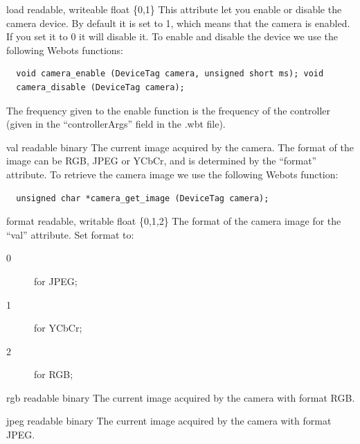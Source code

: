 \noindent
\begin{itemize}
\begin{attribute}{load}
  {readable, writeable}
  {float}
  {\{0,1\}}
  This attribute let you enable or disable the camera
  device.  By default it is set to 1, which means that the camera is
  enabled. If you set it to 0 it will disable it.  To enable and
  disable the device we use the following Webots functions:


\begin{lstlisting}
  void camera_enable (DeviceTag camera, unsigned short ms); void
  camera_disable (DeviceTag camera);
\end{lstlisting}

The frequency given to the enable function is the frequency of the
\urbi controller (given in the ``controllerArgs'' field in the .wbt
file).
\end{attribute}

\begin{attribute}{val}
  {readable}
  {binary}
  {}
  The current image acquired by the camera. The format of
  the image can be RGB, JPEG or YCbCr, and is determined by the
  ``format'' attribute.  To retrieve the camera image we use the
  following Webots function:


\begin{lstlisting}
  unsigned char *camera_get_image (DeviceTag camera);
\end{lstlisting}
\end{attribute}

\begin{attribute}{format}
  {readable, writable}
  {float}
  {\{0,1,2\}}
  The format of the camera image for the ``val''
  attribute. Set format to:

  \begin{description}
  \item[0] for JPEG;
  \item[1] for YCbCr;
  \item[2] for RGB;
  \end{description}
\end{attribute}

\begin{attribute}{rgb}
  {readable}
  {binary}
  {}
  The current image acquired by the camera with format
  RGB.
\end{attribute}

\begin{attribute}{jpeg}
  {readable}
  {binary}
  {}
  The current image acquired by the camera with format
  JPEG.
\end{attribute}


\end{itemize}
